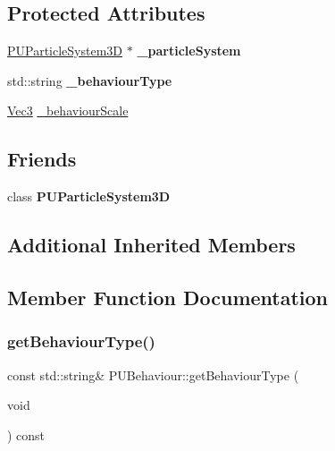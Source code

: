 \subsection*{Protected Attributes}
\begin{DoxyCompactItemize}
\item 
\mbox{\label{classPUBehaviour_ab9a5f5192707ca0196348bcfa410171b}} 
\hyperlink{classPUParticleSystem3D}{P\+U\+Particle\+System3D} $\ast$ {\bfseries \+\_\+particle\+System}
\item 
\mbox{\label{classPUBehaviour_a4d2a7bb631fcd3a861e0dca51a14af7d}} 
std\+::string {\bfseries \+\_\+behaviour\+Type}
\item 
\hyperlink{classVec3}{Vec3} \hyperlink{classPUBehaviour_a50b0f3e7c92ea57a66c1727c0b487300}{\+\_\+behaviour\+Scale}
\end{DoxyCompactItemize}
\subsection*{Friends}
\begin{DoxyCompactItemize}
\item 
\mbox{\label{classPUBehaviour_a6facc234295c573636e9e1f78b0777c8}} 
class {\bfseries P\+U\+Particle\+System3D}
\end{DoxyCompactItemize}
\subsection*{Additional Inherited Members}


\subsection{Member Function Documentation}
\mbox{\label{classPUBehaviour_a9874198e06f7c5a2682f9811a2811b36}} 
\subsubsection{\texorpdfstring{get\+Behaviour\+Type()}{getBehaviourType()}\hspace{0.1cm}{\footnotesize\ttfamily [1/2]}}
{\footnotesize\ttfamily const std\+::string\& P\+U\+Behaviour\+::get\+Behaviour\+Type (\begin{DoxyParamCaption}\item[{void}]{ }\end{DoxyParamCaption}) const\hspace{0.3cm}{\ttfamily [inline]}}


